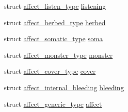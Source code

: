 \begin{DoxyCompactItemize}
\item 
struct \hyperlink{structaffect__listen__type}{affect\-\_\-listen\-\_\-type} \hyperlink{unionaffected__union_a38fd9ada1161469432533e35d96d6a24}{listening}
\item 
struct \hyperlink{structaffect__herbed__type}{affect\-\_\-herbed\-\_\-type} \hyperlink{unionaffected__union_a55f74c011521f3f0a0aaa8d29e48716e}{herbed}
\item 
struct \hyperlink{structaffect__somatic__type}{affect\-\_\-somatic\-\_\-type} \hyperlink{unionaffected__union_a02145b6a5363511a3ded9c0887f86968}{soma}
\item 
struct \hyperlink{structaffect__monster__type}{affect\-\_\-monster\-\_\-type} \hyperlink{unionaffected__union_a3bd426fe92c8bc9bc11f1b7394a26f1a}{monster}
\item 
struct \hyperlink{structaffect__cover__type}{affect\-\_\-cover\-\_\-type} \hyperlink{unionaffected__union_ad30fcc11880dc283492490b4ec44f5a8}{cover}
\item 
struct \hyperlink{structaffect__internal__bleeding}{affect\-\_\-internal\-\_\-bleeding} \hyperlink{unionaffected__union_a496df11695c06bebacd5707d3fc6d559}{bleeding}
\item 
struct \hyperlink{structaffect__generic__type}{affect\-\_\-generic\-\_\-type} \hyperlink{unionaffected__union_adb59b2f1681ae8bc3b1ca089e39dd3a0}{affect}
\end{DoxyCompactItemize}


